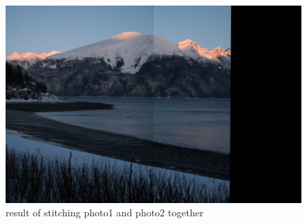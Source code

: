 \documentclass{exam}
\begin{document}
\begin{questions}
\begin{figure}[H]
\caption{result of stitching photo1 and photo2 together}
\centering
\includegraphics[width=14cm]{StitchingOutput.jpg}
\end{figure}

\end{questions}
\end{document}
